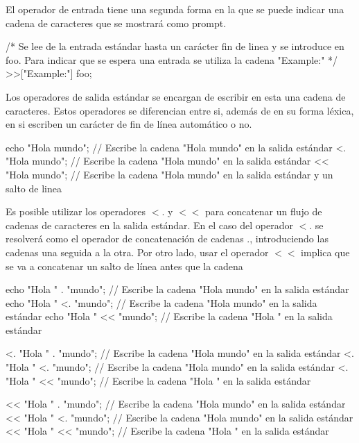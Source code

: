 El operador de entrada tiene una segunda forma en la que se puede indicar una cadena de caracteres
que se mostrará como prompt. \\

\begin{myverbatim}
   /*
      Se lee de la entrada estándar hasta un carácter fin de linea 
      y se introduce en foo. Para indicar que se espera una entrada
      se utiliza la cadena "Example:"
   */
   >>["Example:"] foo;
\end{myverbatim}

Los operadores de salida estándar se encargan de escribir en esta una cadena de caracteres. 
Estos operadores se diferencian entre si, además de en su forma léxica, en si 
escriben un carácter de fin de línea automático o no. 
\\
\begin{myverbatim}
   echo "Hola mundo"; // Escribe la cadena "Hola mundo" en la salida estándar
   <. "Hola mundo"; // Escribe la cadena "Hola mundo" en la salida estándar
   << "Hola mundo"; // Escribe la cadena "Hola mundo" en la salida estándar y un salto de linea
\end{myverbatim}

Es posible utilizar los operadores $<.$ y $<<$ para concatenar un flujo de cadenas de caracteres en la
salida estándar. En el caso del operador $<.$ se resolverá como el operador de concatenación de cadenas 
$.$, introduciendo las cadenas una seguida a la otra. Por otro lado, usar el operador $<<$ implica que se
va a concatenar un salto de línea antes que la cadena\\

\begin{myverbatim}
   echo "Hola " . "mundo"; // Escribe la cadena "Hola mundo" en la salida estándar
   echo "Hola " <. "mundo"; // Escribe la cadena "Hola mundo" en la salida estándar
   echo "Hola " << "mundo"; // Escribe la cadena "Hola \mundo" en la salida estándar
   
   <. "Hola " . "mundo"; // Escribe la cadena "Hola mundo" en la salida estándar
   <. "Hola " <. "mundo"; // Escribe la cadena "Hola mundo" en la salida estándar
   <. "Hola " << "mundo"; // Escribe la cadena "Hola \mundo" en la salida estándar
   
   << "Hola " . "mundo"; // Escribe la cadena "Hola mundo\n" en la salida estándar
   << "Hola " <. "mundo"; // Escribe la cadena "Hola mundo\n" en la salida estándar
   << "Hola " << "mundo"; // Escribe la cadena "Hola \mundo\n" en la salida estándar
\end{myverbatim}

